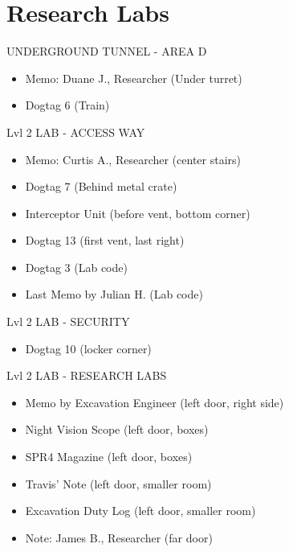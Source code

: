 \chapter{Research Labs}

\begin{subregion}{UNDERGROUND TUNNEL - AREA D}
    \begin{itemize}
        \item Memo: Duane J., Researcher (Under turret)
        \item Dogtag 6 (Train)
    \end{itemize}
\end{subregion}

\begin{subregion}{Lvl 2 LAB - ACCESS WAY}
    \begin{itemize}
        \item Memo: Curtis A., Researcher (center stairs)
        \item Dogtag 7 (Behind metal crate)
        \item Interceptor Unit (before vent, bottom corner)
        \item Dogtag 13 (first vent, last right)
        \item Dogtag 3 (Lab code)
        \item Last Memo by Julian H. (Lab code)
    \end{itemize}
\end{subregion}

\begin{subregion}{Lvl 2 LAB - SECURITY}
    \begin{itemize}
        \item Dogtag 10 (locker corner)
    \end{itemize}
\end{subregion}

\begin{subregion}{Lvl 2 LAB - RESEARCH LABS}
    \begin{itemize}
        \item Memo by Excavation Engineer (left door, right side)
        \item Night Vision Scope (left door, boxes)
        \item SPR4 Magazine (left door, boxes)
        \item Travis' Note (left door, smaller room)
        \item Excavation Duty Log (left door, smaller room)
        \item Note: James B., Researcher (far door)
    \end{itemize}
\end{subregion}

